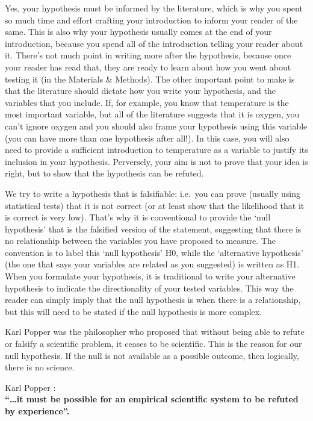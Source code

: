 \documentclass[
]{krantz}
\renewenvironment{quote}{\begin{VF}}{\end{VF}}
\begin{document}
Yes, your hypothesis must be informed by the literature, which is why you spent so much time and effort crafting your introduction to inform your reader of the same. This is also why your hypothesis usually comes at the end of your introduction, because you spend all of the introduction telling your reader about it. There's not much point in writing more after the hypothesis, because once your reader has read that, they are ready to learn about how you went about testing it (in the Materials \& Methods). The other important point to make is that the literature should dictate how you write your hypothesis, and the variables that you include. If, for example, you know that temperature is the most important variable, but all of the literature suggests that it is oxygen, you can't ignore oxygen and you should also frame your hypothesis using this variable (you can have more than one hypothesis after all!). In this case, you will also need to provide a sufficient introduction to temperature as a variable to justify its inclusion in your hypothesis. Perversely, your aim is not to prove that your idea is right, but to show that the hypothesis can be refuted.

We try to write a hypothesis that is falsifiable: i.e.~you can prove (usually using statistical tests) that it is not correct (or at least show that the likelihood that it is correct is very low). That's why it is conventional to provide the `null hypothesis' that is the falsified version of the statement, suggesting that there is no relationship between the variables you have proposed to measure. The convention is to label this `null hypothesis' H0, while the `alternative hypothesis' (the one that says your variables are related as you suggested) is written as H1. When you formulate your hypothesis, it is traditional to write your alternative hypothesis to indicate the directionality of your tested variables. This way the reader can simply imply that the null hypothesis is when there is a relationship, but this will need to be stated if the null hypothesis is more complex.

Karl Popper \citeyearpar{popper2005logic} was the philosopher who proposed that without being able to refute or falsify a scientific problem, it ceases to be scientific. This is the reason for our null hypothesis. If the null is not available as a possible outcome, then logically, there is no science.

\begin{quote}
Karl Popper \citeyearpar{popper2005logic}:\\
\textbf{``\ldots it must be possible for an empirical scientific system to be refuted by experience''. }
\end{quote}
\end{document}
